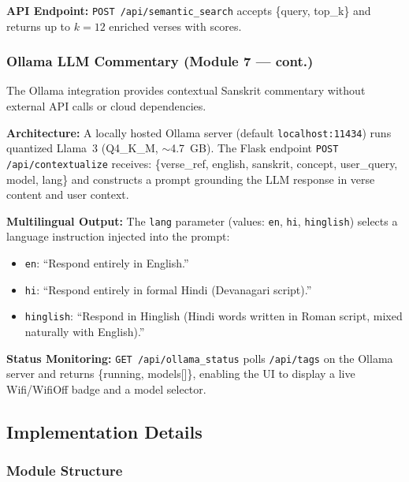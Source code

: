 \documentclass[conference]{IEEEtran}
\begin{document}
\textbf{API Endpoint:} \texttt{POST /api/semantic\_search} accepts
\{query, top\_k\} and returns up to $k = 12$ enriched verses with scores.

\subsubsection{Ollama LLM Commentary (Module 7 — cont.)}

The Ollama integration provides contextual Sanskrit commentary without
external API calls or cloud dependencies.

\textbf{Architecture:} A locally hosted Ollama server (default
\texttt{localhost:11434}) runs quantized Llama~3 (Q4\_K\_M, $\sim$4.7~GB).
The Flask endpoint \texttt{POST /api/contextualize} receives:
\{verse\_ref, english, sanskrit, concept, user\_query, model, lang\}
and constructs a prompt grounding the LLM response in verse content and user context.

\textbf{Multilingual Output:} The \texttt{lang} parameter (values: \texttt{en},
\texttt{hi}, \texttt{hinglish}) selects a language instruction injected into the
prompt:
\begin{itemize}[leftmargin=*]
  \item \texttt{en}: ``Respond entirely in English.''
  \item \texttt{hi}: ``Respond entirely in formal Hindi (Devanagari script).''
  \item \texttt{hinglish}: ``Respond in Hinglish (Hindi words written in Roman
        script, mixed naturally with English).''
\end{itemize}

\textbf{Status Monitoring:} \texttt{GET /api/ollama\_status} polls
\texttt{/api/tags} on the Ollama server and returns \{running, models[]\},
enabling the UI to display a live Wifi/WifiOff badge and a model selector.

\subsection{Implementation Details}

\subsubsection{Module Structure}
\end{document}
